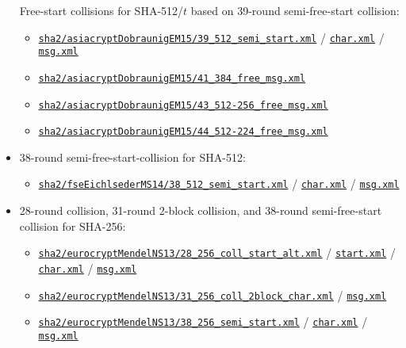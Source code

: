 \documentclass[11pt, a4paper]{article}
\newcommand{\hashlink}[2][black]{\href{https://extgit.iaik.tugraz.at/krypto/nldtool/blob/master/hash/#2}{\color{#1}\nolinkurl{#2}}}
\newcommand{\hashshrt}[3][black]{\href{https://extgit.iaik.tugraz.at/krypto/nldtool/blob/master/hash/#2}{\color{#1}\nolinkurl{#3}}}
\begin{document}
\begin{itemize}
    Free-start collisions for SHA-512/$t$ based on 39-round semi-free-start collision:
    \begin{itemize}
      \item \hashlink[done]{sha2/asiacryptDobraunigEM15/39_512_semi_start.xml}
          / \hashshrt[done]{sha2/asiacryptDobraunigEM15/39_512_semi_char.xml}{char.xml}
          / \hashshrt[done]{sha2/asiacryptDobraunigEM15/39_512_semi_msg.xml}{msg.xml}
      \item \hashlink[done]{sha2/asiacryptDobraunigEM15/41_384_free_msg.xml}
      \item \hashlink[done]{sha2/asiacryptDobraunigEM15/43_512-256_free_msg.xml}
      \item \hashlink[done]{sha2/asiacryptDobraunigEM15/44_512-224_free_msg.xml}
    \end{itemize}

  \item {}

    38-round semi-free-start-collision for SHA-512:
    \begin{itemize}
      \item \hashlink[done]{sha2/fseEichlsederMS14/38_512_semi_start.xml}
          / \hashshrt[done]{sha2/fseEichlsederMS14/38_512_semi_char.xml}{char.xml}
          / \hashshrt[done]{sha2/fseEichlsederMS14/38_512_semi_msg.xml}{msg.xml}
    \end{itemize}

  \item {}

    28-round collision, 31-round 2-block collision, and 38-round semi-free-start
    collision for SHA-256:
    \begin{itemize}
      \item \hashlink[done]{sha2/eurocryptMendelNS13/28_256_coll_start_alt.xml}
          / \hashshrt[done]{sha2/eurocryptMendelNS13/28_256_coll_start.xml}{start.xml}
          / \hashshrt[done]{sha2/eurocryptMendelNS13/28_256_coll_char.xml}{char.xml}
          / \hashshrt[done]{sha2/eurocryptMendelNS13/28_256_coll_msg.xml}{msg.xml}
      \item \hashlink[done]{sha2/eurocryptMendelNS13/31_256_coll_2block_char.xml}
          / \hashshrt[done]{sha2/eurocryptMendelNS13/31_256_coll_2block_msg.xml}{msg.xml}
      \item \hashlink[done]{sha2/eurocryptMendelNS13/38_256_semi_start.xml}
          / \hashshrt[done]{sha2/eurocryptMendelNS13/38_256_semi_char.xml}{char.xml}
          / \hashshrt[done]{sha2/eurocryptMendelNS13/38_256_semi_msg.xml}{msg.xml}
    \end{itemize}


\end{itemize}
\end{document}
